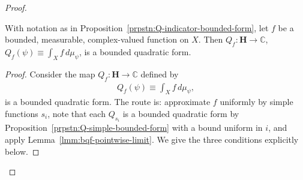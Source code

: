 \begin{proof}
\begin{proposition}
    \label{prpstn:Q-measurable-bounded-form}
    \leanok
    With notation as in Proposition~\ref{prpstn:Q-indicator-bounded-form}, let $f$ be a bounded, measurable, complex-valued function on $X$. Then $Q_f : \mathbf{H} \rightarrow \mathbb{C}$, $Q_f(\psi) \equiv \int_X f \, d\mu_\psi$, is a bounded quadratic form.
\end{proposition}
\begin{proof}
    \leanok
Consider the map $Q_f : \mathbf{H} \rightarrow \mathbb{C}$ defined by
\begin{align}
    Q_f(\psi) \equiv \int_X f \, d\mu_\psi,
\end{align}
is a bounded quadratic form. The route is: approximate $f$ uniformly by simple functions $s_i$, note that each $Q_{s_i}$ is a bounded quadratic form by Proposition~\ref{prpstn:Q-simple-bounded-form} with a bound uniform in $i$, and apply Lemma~\ref{lmm:bqf-pointwise-limit}. We give the three conditions explicitly below.


\end{proof}
\end{proof}
